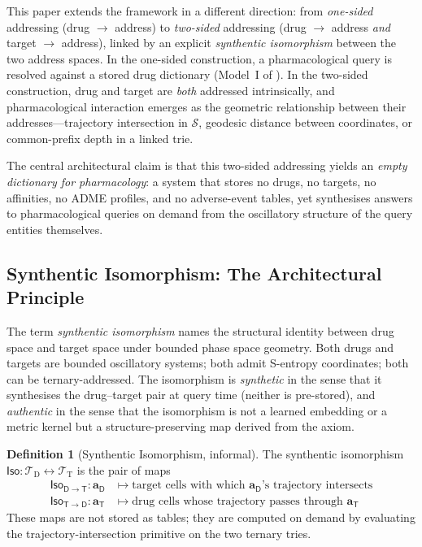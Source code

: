 \documentclass[11pt,twocolumn,a4paper]{article}
\theoremstyle{definition}
\newtheorem{definition}[theorem]{Definition}
\theoremstyle{remark}
\newcommand{\Sspace}{\mathcal{S}}
\newcommand{\Trie}{\mathcal{T}}
\newcommand{\Dtrie}{\Trie_{\mathrm{D}}}
\newcommand{\Ttrie}{\Trie_{\mathrm{T}}}
\newcommand{\Drug}{\mathsf{D}}
\newcommand{\Target}{\mathsf{T}}
\newcommand{\Iso}{\mathsf{Iso}}
\newcommand{\drugaddr}{\mathbf{a}_\Drug}
\newcommand{\targaddr}{\mathbf{a}_\Target}
\begin{document}
This paper extends the framework in a different direction: from \emph{one-sided} addressing (drug $\to$ address) to \emph{two-sided} addressing (drug $\to$ address \emph{and} target $\to$ address), linked by an explicit \emph{synthentic isomorphism} between the two address spaces. In the one-sided construction, a pharmacological query is resolved against a stored drug dictionary (Model~I of \citep{sachikonye2025d}). In the two-sided construction, drug and target are \emph{both} addressed intrinsically, and pharmacological interaction emerges as the geometric relationship between their addresses---trajectory intersection in $\Sspace$, geodesic distance between coordinates, or common-prefix depth in a linked trie.

The central architectural claim is that this two-sided addressing yields an \emph{empty dictionary for pharmacology}: a system that stores no drugs, no targets, no affinities, no ADME profiles, and no adverse-event tables, yet synthesises answers to pharmacological queries on demand from the oscillatory structure of the query entities themselves.

\subsection{Synthentic Isomorphism: The Architectural Principle}

The term \emph{synthentic isomorphism} names the structural identity between drug space and target space under bounded phase space geometry. Both drugs and targets are bounded oscillatory systems; both admit S-entropy coordinates; both can be ternary-addressed. The isomorphism is \emph{synthetic} in the sense that it synthesises the drug--target pair at query time (neither is pre-stored), and \emph{authentic} in the sense that the isomorphism is not a learned embedding or a metric kernel but a structure-preserving map derived from the axiom.

\begin{definition}[Synthentic Isomorphism, informal]
\label{def:synthentic_informal}
The synthentic isomorphism $\Iso: \Dtrie \leftrightarrow \Ttrie$ is the pair of maps
\begin{align*}
\Iso_{\Drug \to \Target}: \drugaddr &\mapsto \text{target cells with which $\drugaddr$'s trajectory intersects} \\
\Iso_{\Target \to \Drug}: \targaddr &\mapsto \text{drug cells whose trajectory passes through $\targaddr$}
\end{align*}
These maps are not stored as tables; they are computed on demand by evaluating the trajectory-intersection primitive on the two ternary tries.
\end{definition}
\end{document}
